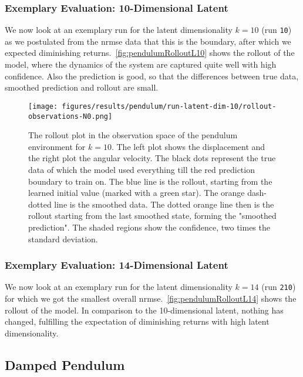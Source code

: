 		\subsubsection{Exemplary Evaluation: 10-Dimensional Latent}
			\label{subsubsec:pendulumL10}

			We now look at an exemplary run for the latent dimensionality \( k = 10 \) (run \texttt{10}) as we postulated from the \ac{nrmse} data that this is the boundary, after which we expected diminishing returns.~\autoref{fig:pendulumRolloutL10} shows the rollout of the model, where the dynamics of the system are captured quite well with high confidence. Also the prediction is good, so that the differences between true data, smoothed prediction and rollout are small.

			\begin{figure}[H]
				\centering
				\texttt{[image: figures/results/pendulum/run-latent-dim-10/rollout-observations-N0.png]}
				\caption[Rollout of the pendulum experiment for 10 latent dimensions]{The rollout plot in the observation space of the pendulum environment for \(k = 10\). The left plot shows the displacement and the right plot the angular velocity. The black dots represent the true data of which the model used everything till the red prediction boundary to train on. The blue line is the rollout, starting from the learned initial value (marked with a green star). The orange dash-dotted line is the smoothed data. The dotted orange line then is the rollout starting from the last smoothed state, forming the "smoothed prediction". The shaded regions show the confidence, \ie two times the standard deviation.}
				\label{fig:pendulumRolloutL10}
			\end{figure}

		\subsubsection{Exemplary Evaluation: 14-Dimensional Latent}
			\label{subsubsec:pendulumL14}

			We now look at an exemplary run for the latent dimensionality \( k = 14 \) (run \texttt{210}) for which we got the smallest overall \ac{nrmse}.~\autoref{fig:pendulumRolloutL14} shows the rollout of the model. In comparison to the 10-dimensional latent, nothing has changed, fulfilling the expectation of diminishing returns with high latent dimensionality.

	\subsection{Damped Pendulum} %
